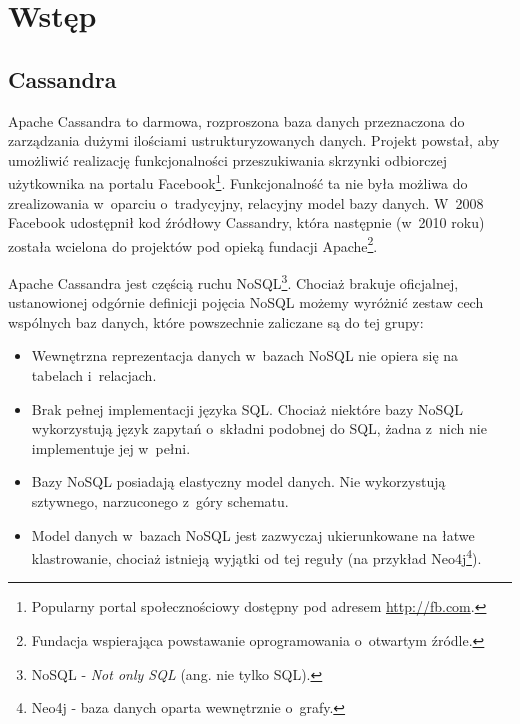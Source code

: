 \documentclass{report}
\begin{document}
\chapter{Wstęp}

\section{Cassandra}

Apache Cassandra to darmowa, rozproszona baza danych przeznaczona do zarządzania dużymi ilościami ustrukturyzowanych danych. Projekt powstał, aby umożliwić realizację funkcjonalności przeszukiwania skrzynki odbiorczej użytkownika na portalu Facebook\footnote{Popularny portal społecznościowy dostępny pod adresem \url{http://fb.com}.}. Funkcjonalność ta nie była możliwa do zrealizowania w~oparciu o~tradycyjny, relacyjny model bazy danych. W~2008 Facebook udostępnił kod źródłowy Cassandry, która następnie (w~2010 roku) została wcielona do projektów pod opieką fundacji Apache\footnote{Fundacja wspierająca powstawanie oprogramowania o~otwartym źródle.}.\cite{casshistory} 

Apache Cassandra jest częścią ruchu NoSQL\footnote{NoSQL - \emph{Not only SQL} (ang. nie tylko SQL).}. Chociaż brakuje oficjalnej, ustanowionej odgórnie definicji pojęcia NoSQL możemy wyróżnić zestaw cech wspólnych baz danych, które powszechnie zaliczane są do tej grupy:

\begin{itemize}
	\item Wewnętrzna reprezentacja danych w~bazach NoSQL nie opiera się na tabelach i~relacjach.
	\item Brak pełnej implementacji języka SQL. Chociaż niektóre bazy NoSQL wykorzystują język zapytań o~składni podobnej do SQL, żadna z~nich nie implementuje jej w~pełni.
	\item Bazy NoSQL posiadają elastyczny model danych. Nie wykorzystują sztywnego, narzuconego z~góry schematu.
	\item Model danych w~bazach NoSQL jest zazwyczaj ukierunkowane na łatwe klastrowanie, chociaż istnieją wyjątki od tej reguły (na przykład Neo4j\footnote{Neo4j - baza danych oparta wewnętrznie o~grafy.}). \cite{nosqldistilled}
\end{itemize}



\printbibliography
\end{document}
